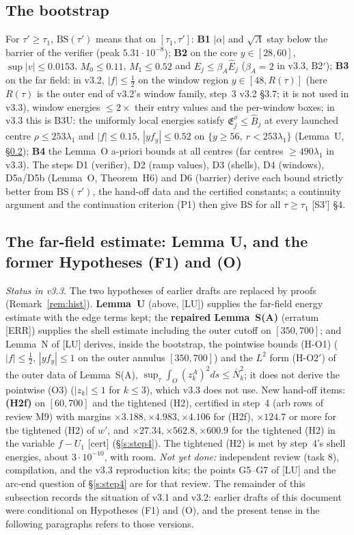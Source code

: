 \documentclass[11pt]{amsart}
\theoremstyle{definition}
\theoremstyle{remark}
\newcommand{\Lam}{\Lambda}
\newcommand{\dref}[1]{[\textsf{#1}]}
\begin{document}
\subsection{The bootstrap}\label{ss:boot}
For $\tau'\ge\tau_1$, $\mathrm{BS}(\tau')$ means that on $[\tau_1,\tau']$: \textbf{B1} $|\alpha|$ and $\sqrt\Lam$ stay below the barrier of the verifier (peak $5.31\cdot10^{-8}$); \textbf{B2} on the core $y\in[28,60]$, $\sup|v|\le0.0153$, $M_0\le0.11$, $M_1\le0.52$ and $E_j\le\beta_A\hat E_j$ ($\beta_A=2$ in v3.3, B2$'$); \textbf{B3} on the far field: in v3.2, $|f|\le\frac12$ on the window region $y\in[48,R(\tau)]$ (here $R(\tau)$ is the outer end of v3.2's window family, step~3 v3.2 \S3.7; it is not used in v3.3), window energies $\le2\times$ their entry values and the per-window boxes; in v3.3 this is B3U: the uniformly local energies satisfy $\mathfrak E^\rho_j\le\hat B_j$ at every launched centre $\rho\le253\lambda_1$ and $|f|\le0.15$, $|yf_y|\le0.52$ on $\{y\ge56,\ r<253\lambda_1\}$ (Lemma~U, \S\ref{ss:gap}); \textbf{B4} the Lemma~O a-priori bounds at all centres (far centres $\ge490\lambda_1$ in v3.3). The steps D1 (verifier), D2 (ramp values), D3 (shells), D4 (windows), D5a/D5b (Lemma~O, Theorem~H6) and D6 (barrier) derive each bound strictly better from $\mathrm{BS}(\tau')$, the hand-off data and the certified constants; a continuity argument and the continuation criterion (P1) then give $\mathrm{BS}$ for all $\tau\ge\tau_1$ \dref{S3'} \S4.

\subsection{The far-field estimate: Lemma U, and the former Hypotheses (F1) and (O)}\label{ss:gap}
\emph{Status in v3.3.} The two hypotheses of earlier drafts are replaced by proofs (Remark~\ref{rem:hist}). \textbf{Lemma~U} (above, \dref{LU}) supplies the far-field energy estimate with the edge terms kept; the \textbf{repaired Lemma~S(A)} (erratum \dref{ERR}) supplies the shell estimate including the outer cutoff on $[350,700]$; and Lemma~N of \dref{LU} derives, inside the bootstrap, the pointwise bounds (H-O1) ($|f|\le\frac12$, $|yf_y|\le1$ on the outer annulus $[350,700]$) and the $L^2$ form (H-O2$'$) of the outer data of Lemma~S(A), $\sup_\tau\int_O(z^A_k)^2ds\le\bar N^2_k$; it does not derive the pointwise (O3) ($|z_k|\le1$ for $k\le3$), which v3.3 does not use. New hand-off items: \textbf{(H2f)} on $[60,700]$ and the tightened (H2), certified in step~4 (arb rows of review M9) with margins $\times3.188,\times4.983,\times4.106$ for (H2f), $\times124.7$ or more for the tightened (H2) of $w'$, and $\times27.34,\times562.8,\times600.9$ for the tightened (H2) in the variable $f-U_1$ \textup{[cert]} (\S\ref{s:step4}). The tightened (H2) is met by step~4's shell energies, about $3\cdot10^{-10}$, with room. \emph{Not yet done:} independent review (task 8), compilation, and the v3.3 reproduction kits; the points G5--G7 of \dref{LU} and the arc-end question of \S\ref{s:step4} are for that review. The remainder of this subsection records the situation of v3.1 and v3.2: earlier drafts of this document were conditional on Hypotheses (F1) and (O), and the present tense in the following paragraphs refers to those versions.
\end{document}
